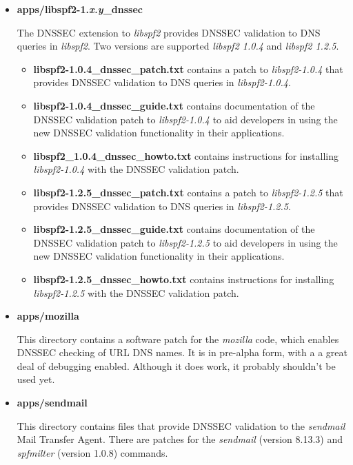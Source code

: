 \documentclass[12pt]{article}
\newcommand{\cmd}[1]{{\em #1}}
\newcommand{\lib}[1]{{\em #1}}
\newcommand{\path}[1]{{\bf #1}}
\begin{document}
\begin{itemize}

\item{\path{apps/libspf2-1.{\it x.y}\_dnssec}}

The DNSSEC extension to \lib{libspf2} provides DNSSEC validation to DNS
queries in \lib{libspf2}.
Two versions are supported \lib{libspf2 1.0.4} and \lib{libspf2 1.2.5}.

\begin{itemize}
\item \path{libspf2-1.0.4\_dnssec\_patch.txt} contains a patch to
\lib{libspf2-1.0.4} that provides DNSSEC validation to DNS queries in
\lib{libspf2-1.0.4}.

\item \path{libspf2-1.0.4\_dnssec\_guide.txt} contains documentation
of the DNSSEC validation patch to \lib{libspf2-1.0.4} to aid developers in
using the new DNSSEC validation functionality in their applications.

\item \path{libspf2\_1.0.4\_dnssec\_howto.txt} contains instructions for
installing \lib{libspf2-1.0.4} with the DNSSEC validation patch.

\item \path{libspf2-1.2.5\_dnssec\_patch.txt} contains a patch to
\lib{libspf2-1.2.5} that provides DNSSEC validation to DNS queries in
\lib{libspf2-1.2.5}.

\item \path{libspf2-1.2.5\_dnssec\_guide.txt} contains documentation
of the DNSSEC validation patch to \lib{libspf2-1.2.5} to aid developers in
using the new DNSSEC validation functionality in their applications.

\item \path{libspf2-1.2.5\_dnssec\_howto.txt} contains instructions for
installing \lib{libspf2-1.2.5} with the DNSSEC validation patch.

\end{itemize}

\item{\path{apps/mozilla}}

This directory contains a software patch for the \cmd{mozilla} code, which
enables DNSSEC checking of URL DNS names.  It is in pre-alpha form, with a a
great deal of debugging enabled.  Although it does work, it probably shouldn't
be used yet.

\item{\path{apps/sendmail}}

This directory contains files that provide DNSSEC validation to
the \cmd{sendmail} Mail Transfer Agent.  There are patches for the
\cmd{sendmail} (version 8.13.3) and \cmd{spfmilter} (version 1.0.8) commands.


\end{itemize}
\end{document}
